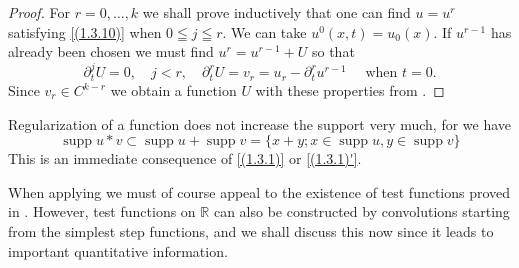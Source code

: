 \begin{proof}
    For $r=0, \ldots, k$ we shall prove inductively that one can find $u=u^{r}$ satisfying \eqref{(1.3.10)} when $0 \leqq j \leqq r$. We can take $u^{0}(x, t)=u_{0}(x)$. If $u^{r-1}$ has already been chosen we must find $u^{r}=u^{r-1}+U$ so that
\[
	\partial_{t}^{j} U=0, \quad j<r, \quad \partial_{t}^{r} U=v_{r}=u_{r}-\partial_{t}^{r} u^{r-1} \quad \text { when } t=0.
\]
Since $v_{r} \in C^{k-r}$ we obtain a function $U$ with these properties from .
\end{proof}
Regularization of a function does not increase the support very much, for we have
\begin{equation}
    \label{(1.3.11)}
    \operatorname{supp} u * v \subset \operatorname{supp} u+\operatorname{supp} v=\{x+y ; x \in \operatorname{supp} u, y \in \operatorname{supp} v\}
\end{equation}
This is an immediate consequence of \eqref{(1.3.1)} or \eqref{(1.3.1)'}.

When applying  we must of course appeal to the existence of test functions proved in . However, test functions on $\mathbb{R}$ can also be constructed by convolutions starting from the simplest step functions, and we shall discuss this now since it leads to important quantitative information.

